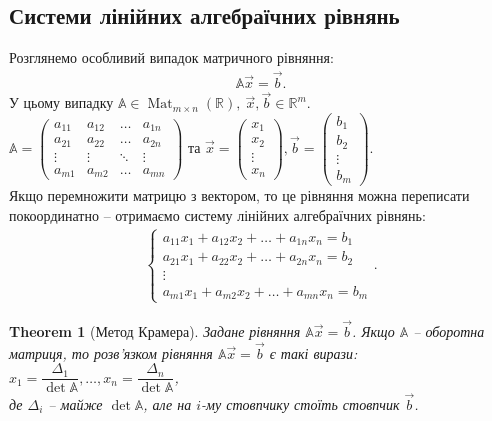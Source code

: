 \documentclass[a4paper, 10pt]{article}
\theoremstyle{theoremdd}
\newtheorem{theorem}{Theorem}[subsection]
\DeclareMathOperator{\Mat}{Mat}
\begin{document}
\subsection{Системи лінійних алгебраїчних рівнянь}
Розглянемо особливий випадок матричного рівняння:
\begin{align*}
\mathbb{A} \vec{x} = \vec{b}.
\end{align*}
У цьому випадку $\mathbb{A} \in \Mat_{m \times n}(\mathbb{R}),\ \vec{x},\vec{b} \in \mathbb{R}^m$.\\
$\mathbb{A} = \begin{pmatrix}
a_{11} & a_{12} & \dots & a_{1n} \\
a_{21} & a_{22} & \dots & a_{2n} \\
\vdots & \vdots & \ddots & \vdots \\
a_{m1} & a_{m2} & \dots & a_{mn}
\end{pmatrix}$ та $\vec{x} = \begin{pmatrix}
x_1 \\ x_2 \\ \vdots \\ x_n
\end{pmatrix}, \vec{b} = \begin{pmatrix}
b_1 \\ b_2 \\ \vdots \\ b_m
\end{pmatrix}$.\\
Якщо перемножити матрицю з вектором, то це рівняння можна переписати покоординатно -- отримаємо систему лінійних алгебраїчних рівнянь:
\begin{align*}
\begin{cases}
a_{11}x_1 + a_{12}x_2 + \dots + a_{1n}x_n = b_1 \\
a_{21}x_1 + a_{22}x_2 + \dots + a_{2n}x_n = b_2 \\
\vdots \\
a_{m1}x_1 + a_{m2}x_2 + \dots + a_{mn}x_n = b_m
\end{cases}.
\end{align*}

\begin{theorem}[Метод Крамера]
Задане рівняння $\mathbb{A} \vec{x} = \vec{b}$. Якщо $\mathbb{A}$ -- оборотна матриця, то розв'язком рівняння $\mathbb{A} \vec{x} = \vec{b}$ є такі вирази: \\
$x_1 = \dfrac{\Delta_1}{\det \mathbb{A}}, \dots, x_n = \dfrac{\Delta_n}{\det \mathbb{A}}$,\\
де $\Delta_i$ -- майже $\det \mathbb{A}$, але на $i$-му стовпчику стоїть стовпчик $\vec{b}$.
\end{theorem}
\end{document}
